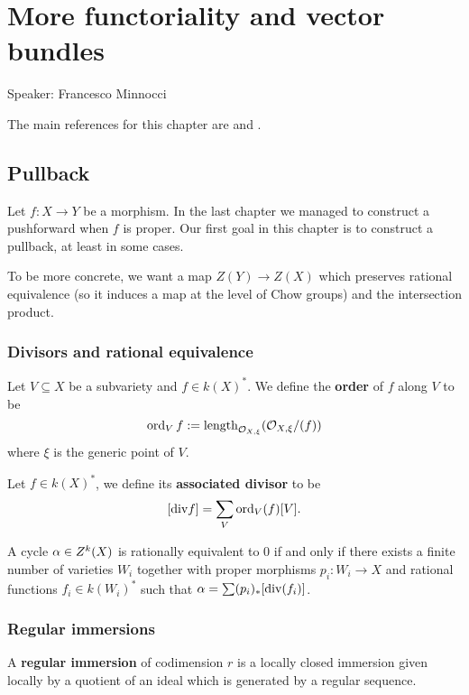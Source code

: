 \chapter{More functoriality and vector bundles}
\begin{center}
	{\huge Speaker: Francesco Minnocci}
\end{center}
\bigskip

\noindent
The main references for this chapter are \cite{fulton1984intersection} and \cite{eisenbud20163264}. 



\section{Pullback}

Let $f:X\to Y$ be a morphism. In the last chapter we managed to construct a pushforward when $f$ is proper. Our first goal in this chapter is to construct a pullback, at least in some cases.


To be more concrete, we want a map $Z(Y)\to Z(X)$ which preserves rational equivalence (so it induces a map at the level of Chow groups) and the intersection product.

\subsection{Divisors and rational equivalence}
\begin{definition}[]
Let $V\subseteq X$ be a subvariety and $f\in k(X)^\ast$. We define the \textbf{order} of $f$ along $V$ to be
\[\operatorname{ord}_Vf:=\operatorname{length}_{\mathcal{O}_{X,\xi}}(\mathcal{O}_{X,\xi}/(f))\]
where $\xi$ is the generic point of $V$.
\end{definition}


\begin{definition}[]
Let $f\in k(X)^\ast$, we define its \textbf{associated divisor} to be
\[[\mathrm{div} f]=\sum_V\operatorname{ord}_V(f)[V].\]
\end{definition}


\begin{proposition}[]
A cycle $\alpha\in Z^k(X)$ is rationally equivalent to $0$ if and only if there exists a finite number of varieties $W_i$ together with proper morphisms $p_i:W_i\to X$ and rational functions $f_i\in k(W_i)^\ast$ such that $\alpha=\sum (p_i)_\ast[\mathrm{div}(f_i)]$.
\end{proposition}

\subsection{Regular immersions}
\begin{definition}[]
A \textbf{regular immersion} of codimension $r$ is a locally closed immersion given locally by a quotient of an ideal which is generated by a regular sequence.
\end{definition}

